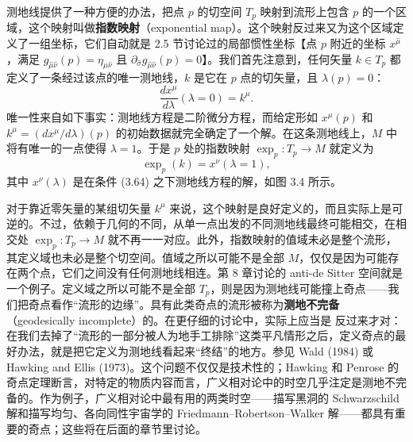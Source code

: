测地线提供了一种方便的办法，把点 $p$ 的切空间 $T_p$ 映射到流形上包含 $p$ 的一个区域，这个映射叫做\textbf{指数映射}（exponential map）。这个映射反过来又为这个区域定义了一组坐标，它们自动就是 2.5 节讨论过的局部惯性坐标【点 $p$ 附近的坐标 $x^{\hat\mu}$，满足 $g_{\hat\mu\hat\nu}(p) = \eta_{\hat\mu\hat\nu}$ 且 $\partial_{\hat\sigma}g_{\hat\mu\hat\nu}(p) = 0$】。我们首先注意到，任何矢量 $k \in T_p$ 都定义了一条经过该点的唯一测地线，$k$ 是它在 $p$ 点的切矢量，且 $\lambda(p) = 0$：
\begin{equation*}
\frac{dx^\mu}{d\lambda}(\lambda = 0) = k^\mu.
\tag{3.64}
\end{equation*}
唯一性来自如下事实：测地线方程是二阶微分方程，而给定形如 $x^\mu(p)$ 和 $k^\mu = (dx^\mu/d\lambda)(p)$ 的初始数据就完全确定了一个解。在这条测地线上，$M$ 中将有唯一的一点使得 $\lambda = 1$。于是 $p$ 处的指数映射 $\exp_p : T_p \rightarrow M$ 就定义为
\begin{equation*}
\exp_p(k) = x^\nu(\lambda = 1),
\tag{3.65}
\end{equation*}
其中 $x^\nu(\lambda)$ 是在条件 (3.64) 之下测地线方程的解，如图 3.4 所示。

对于靠近零矢量的某组切矢量 $k^\mu$ 来说，这个映射是良好定义的，而且实际上是可逆的。不过，依赖于几何的不同，从单一点出发的不同测地线最终可能相交，在相交处 $\exp_p : T_p \rightarrow M$ 就不再一一对应。此外，指数映射的值域未必是整个流形，其定义域也未必是整个切空间。值域之所以可能不是全部 $M$，仅仅是因为可能存在两个点，它们之间没有任何测地线相连。第 8 章讨论的 anti-de Sitter 空间就是一个例子。定义域之所以可能不是全部 $T_p$，则是因为测地线可能撞上奇点——我们把奇点看作“流形的边缘”。具有此类奇点的流形被称为\textbf{测地不完备}（geodesically incomplete）的。在更仔细的讨论中，实际上应当是
反过来才对：在我们去掉了“流形的一部分被人为地手工排除”这类平凡情形之后，定义奇点的最好办法，就是把它定义为测地线看起来“终结”的地方。参见 Wald (1984) 或 Hawking and Ellis (1973)。这个问题不仅仅是技术性的；Hawking 和 Penrose 的奇点定理断言，对特定的物质内容而言，广义相对论中的时空几乎注定是测地不完备的。作为例子，广义相对论中最有用的两类时空——描写黑洞的 Schwarzschild 解和描写均匀、各向同性宇宙学的 Friedmann–Robertson–Walker 解——都具有重要的奇点；这些将在后面的章节里讨论。

